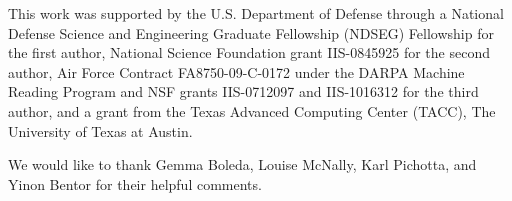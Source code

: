This work was supported by the U.S. Department of Defense through a National
Defense Science and Engineering Graduate Fellowship (NDSEG) Fellowship for the
first author, National Science Foundation grant IIS-0845925 for the second
author, Air Force Contract FA8750-09-C-0172 under the DARPA Machine Reading
Program and NSF grants IIS-0712097 and IIS-1016312 for the third author, and a
grant from the Texas Advanced Computing Center (TACC), The University of Texas
at Austin.

We would like to thank Gemma Boleda, Louise McNally, Karl Pichotta, and Yinon 
Bentor for their helpful comments.

